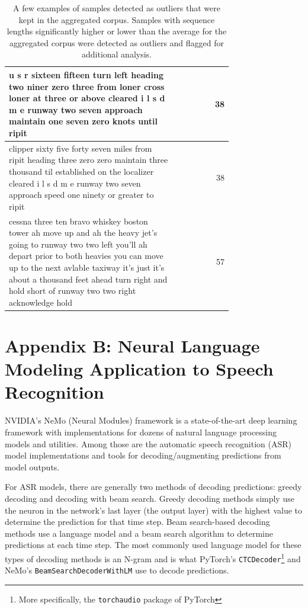 \documentclass[12pt]{article}
\begin{document}
\begin{table}
\begin{tabular}{p{0.75\linewidth} r}
        \midrule
        u s r sixteen fifteen turn left heading two niner zero three from loner cross loner at three or above cleared i l s d m e runway two seven approach maintain one seven zero knots until ripit                                                                                                                               & 38              \\
        \midrule
        clipper sixty five forty seven miles from ripit heading three zero zero maintain three thousand til established on the localizer cleared i l s d m e runway two seven approach speed one ninety or greater to ripit                                                                                                         & 38              \\
        \midrule
        cessna three ten bravo whiskey boston tower ah move up and ah the heavy jet's going to runway two two left you'll ah depart prior to both heavies you can move up to the next avlable taxiway it's just it's about a thousand feet ahead turn right and hold short of runway two two right acknowledge hold                 & 57              \\
        \bottomrule
    \end{tabular}
    \caption{A few examples of samples detected as outliers that were kept in the aggregated corpus. Samples with sequence lengths significantly
        higher or lower than the average for the aggregated corpus were detected as outliers and flagged for additional analysis.}
    \label{tab:outlier_examples}
\end{table}

\newpage
\section{Appendix B: Neural Language Modeling Application to Speech Recognition}\label{sec:appendix_b}
NVIDIA's NeMo (Neural Modules) framework \cite{kuchaiev_nemo_2019} is a state-of-the-art deep learning framework with implementations for dozens of
natural language processing models and utilities. Among those are the automatic speech recognition (ASR) model implementations and tools for
decoding/augmenting predictions from model outputs.

For ASR models, there are generally two methods of decoding predictions: greedy decoding and decoding with beam search. Greedy decoding methods simply
use the neuron in the network's last layer (the output layer) with the highest value to determine the prediction for that time step. Beam search-based
decoding methods use a language model and a beam search algorithm to determine predictions at each time step. The most commonly used language model
for these types of decoding methods is an N-gram and is what PyTorch's \lstinline|CTCDecoder|\footnote{More specifically, the \lstinline|torchaudio|
    package of PyTorch} \cite{paszke_pytorch_2019} and NeMo's \lstinline|BeamSearchDecoderWithLM| \cite{kuchaiev_nemo_2019} use to decode predictions.
\end{document}
